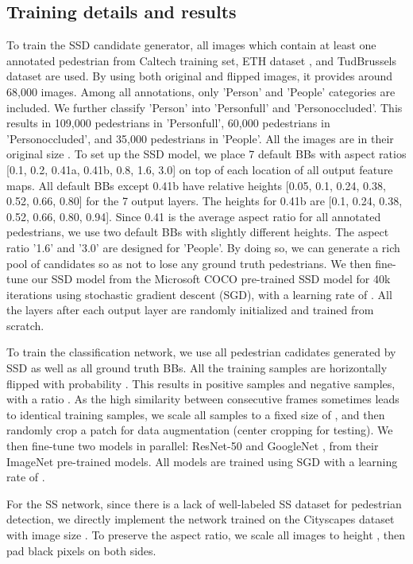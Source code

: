 \documentclass[10pt,letterpaper]{article}
\begin{document}
\subsection{Training details and results}
To train the SSD candidate generator, all images which contain at least one annotated pedestrian from Caltech training set, ETH dataset \cite{eth}, and TudBrussels dataset \cite{Tudbrussel} are used. By using both original and flipped images, it provides around 68,000 images. Among all annotations, only 'Person' and 'People' categories are included. We further classify 'Person' into 'Person\textunderscore full' and 'Person\textunderscore occluded'. This results in 109,000 pedestrians in 'Person\textunderscore full', 60,000 pedestrians in 'Person\textunderscore occluded', and 35,000 pedestrians in 'People'. All the images are in their original size . To set up the SSD model, we place 7 default BBs with aspect ratios [0.1, 0.2, 0.41a, 0.41b, 0.8, 1.6, 3.0] on top of each location of all output feature maps. All default BBs except 0.41b have relative heights [0.05, 0.1, 0.24, 0.38, 0.52, 0.66, 0.80] for the 7 output layers. The heights for 0.41b are [0.1, 0.24, 0.38, 0.52, 0.66, 0.80, 0.94]. Since 0.41 is the average aspect ratio for all annotated pedestrians, we use two default BBs with slightly different heights. The aspect ratio '1.6' and '3.0' are designed for 'People'. By doing so, we can generate a rich pool of candidates so as not to lose any ground truth pedestrians. We then fine-tune our SSD model from the Microsoft COCO \cite{coco} pre-trained SSD model for 40k iterations using stochastic gradient descent (SGD), with a learning rate of . All the layers after each output layer are randomly initialized and trained from scratch.   

To train the classification network, we use all pedestrian cadidates generated by SSD as well as all ground truth BBs. All the training samples are horizontally flipped with probability . This results in  positive samples and  negative samples, with a ratio . As the high similarity between consecutive frames sometimes leads to identical training samples, we scale all samples to a fixed size of , and then randomly crop a  patch for data augmentation (center cropping for testing). We then fine-tune two models in parallel: ResNet-50 \cite{res50} and GoogleNet \cite{googlenet}, from their ImageNet pre-trained models. All models are trained using SGD with a learning rate of . 

For the SS network, since there is a lack of well-labeled SS dataset for pedestrian detection, we directly implement the network trained on the Cityscapes dataset with image size . To preserve the aspect ratio, we scale all images to height , then pad black pixels on both sides. 
\end{document}

